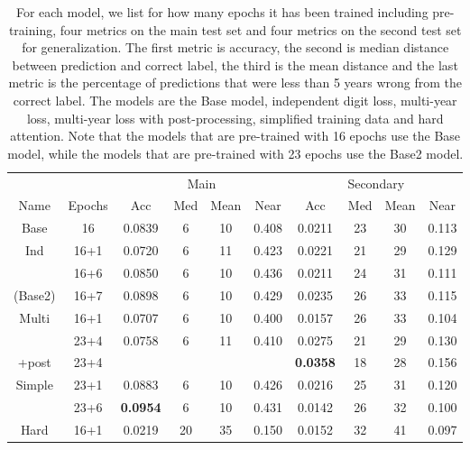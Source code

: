 
\begin{table}
  \centering
  \begin{tabular}{|c|c||c|c|c|c||c|c|c|c|}
    \hline
    & & \multicolumn{4}{c||}{Main} & \multicolumn{4}{c|}{Secondary} \\
    Name & Epochs & Acc & Med & Mean & Near & Acc & Med & Mean & Near \\
    \hline
    Base & 16 & 0.0839 & 6 & 10 & 0.408 & 0.0211 & 23 & 30 & 0.113 \\
    \hline
    Ind & 16+1 & 0.0720 & 6 & 11 & 0.423 & 0.0221 & 21 & 29 & 0.129 \\
    & 16+6 & 0.0850 & 6 & 10 & 0.436 & 0.0211 & 24 & 31 & 0.111 \\
    (Base2) & 16+7 & 0.0898 & 6 & 10 & 0.429 & 0.0235 & 26 & 33 & 0.115 \\
    \hline
    Multi & 16+1 & 0.0707 & 6 & 10 & 0.400 & 0.0157 & 26 & 33 & 0.104 \\
    & 23+4 & 0.0758 & 6 & 11 & 0.410 & 0.0275 & 21 & 29 & 0.130 \\
    +post & 23+4 & & & & & \textbf{0.0358} & 18 & 28 & 0.156 \\
    \hline
    Simple & 23+1 & 0.0883 & 6 & 10 & 0.426 & 0.0216 & 25 & 31 & 0.120 \\
    & 23+6 & \textbf{0.0954} & 6 & 10 & 0.431 & 0.0142 & 26 & 32 & 0.100 \\
    \hline
    Hard & 16+1 & 0.0219 & 20 & 35 & 0.150 & 0.0152 & 32 & 41 & 0.097 \\
    \hline
  \end{tabular}
  \caption{For each model, we list for how many epochs it has been trained including pre-training, four metrics on the main test set and four metrics on the second test set for generalization.
  The first metric is accuracy, the second is median distance between prediction and correct label, the third is the mean distance and the last metric is the percentage of predictions that were less than 5 years wrong from the correct label.
  The models are the Base model, independent digit loss, multi-year loss, multi-year loss with post-processing, simplified training data and hard attention.
  Note that the models that are pre-trained with 16 epochs use the Base model, while the models that are pre-trained with 23 epochs use the Base2 model.
  }
  \label{tab:model_overview}
\end{table}
